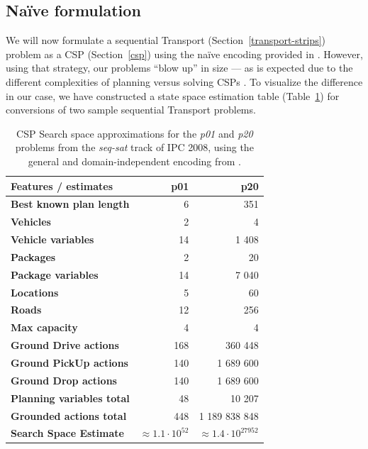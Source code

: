 
\subsection{Na{\"{i}}ve formulation}

We will now formulate a sequential Transport (Section~\ref{transport-strips}) problem as a CSP (Section~\ref{csp}) using the na{\"{i}}ve encoding provided in \citet[Section~8.3]{Ghallab2004}.
However, using that strategy, our problems ``blow up'' in size --- as is expected due
to the different complexities of planning versus solving CSPs \citep[Section~8.3.2]{Ghallab2004}. To visualize the difference in our case, we have constructed a state space estimation table (Table~\ref{tab:csp-trivial}) for conversions of two sample sequential Transport problems.

\begin{table}[tb]
\begin{center}
\begin{tabular}{l||rr}
\textbf{Features / estimates} & \textbf{p01} & \textbf{p20} \\ 
\hline 
\hline 
\textbf{Best known plan length} & 6 & 351 \\ 
\textbf{Vehicles} & 2 & 4 \\ 
\textbf{Vehicle variables} & 14 & 1 408 \\ 
\textbf{Packages} & 2 & 20 \\ 
\textbf{Package variables} & 14 & 7 040 \\ 
\textbf{Locations} & 5 & 60 \\ 
\textbf{Roads} & 12 & 256 \\
\textbf{Max capacity} & 4 & 4 \\ 
\hline
\textbf{Ground Drive actions} & 168 & 360 448 \\ 
\textbf{Ground PickUp actions} & 140 & 1 689 600 \\ 
\textbf{Ground Drop actions} & 140 & 1 689 600 \\ 
\hline 
\textbf{Planning variables total} & 48 & 10 207 \\ 
\textbf{Grounded actions total} & 448 & 1 189 838 848 \\ 
\textbf{Search Space Estimate} & $\approx 1.1 \cdot 10^{52}$ & $\approx 1.4 \cdot 10^{27 952}$ \\ %
\end{tabular}
\end{center}
\caption[Search space approximations for a na{\"{i}}ve CSP encoding.]{CSP Search space approximations for the \textit{p01} and \textit{p20} problems from the \textit{seq-sat} track of IPC 2008, using the general and domain-independent encoding from \citet[Section~8.3]{Ghallab2004}.}
\label{tab:csp-trivial}
\end{table}

